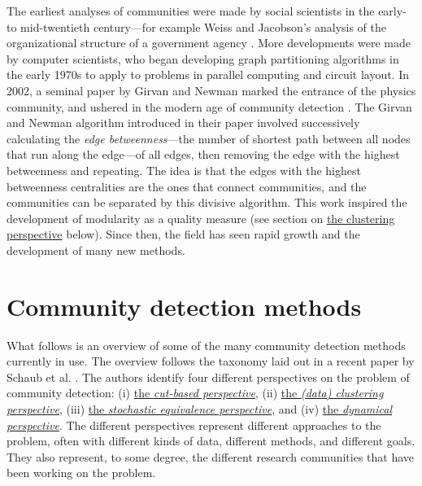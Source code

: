 The earliest analyses of communities were made by social scientists in
the early- to mid-twentieth century---for example Weiss and Jacobson's
analysis of the organizational structure of a government agency
\autocite{weiss_method_1955}. More developments were made by computer
scientists, who began developing graph partitioning algorithms in the
early 1970s to apply to problems in parallel computing and circuit
layout. In 2002, a seminal paper by Girvan and Newman
\autocite{girvan_community_2002} marked the entrance of the physics
community, and ushered in the modern age of community detection
\autocite{lancichinetti_community_2009}. The Girvan and Newman algorithm
introduced in their paper involved successively calculating the
\emph{edge betweenness}---the number of shortest path between all nodes
that run along the edge---of all edges, then removing the edge with the
highest betweenness and repeating. The idea is that the edges with the
highest betweenness centralities are the ones that connect communities,
and the communities can be separated by this divisive algorithm. This
work inspired the development of modularity as a quality measure (see
section on \protect\hyperlink{clustering-perspective}{the clustering
perspective} below). Since then, the field has seen rapid growth and the
development of many new methods.

\hypertarget{community-detection-methods}{\section{Community detection
methods}\label{community-detection-methods}}

\protect\hyperlink{community-detection-methods}{}

What follows is an overview of some of the many community detection
methods currently in use. The overview follows the taxonomy laid out in
a recent paper by Schaub et al. \autocite{schaub_many_2017}. The authors
identify four different perspectives on the problem of community
detection: (i) \protect\hyperlink{the-cut-based-perspective}{the
\emph{cut-based perspective}}, (ii)
\protect\hyperlink{the-clustering-perspective}{the \emph{(data)
clustering perspective}}, (iii)
\protect\hyperlink{the-stochastic-equivalence-perspective}{the
\emph{stochastic equivalence perspective}}, and (iv)
\protect\hyperlink{the-dynamical-perspective}{the \emph{dynamical
perspective}}. The different perspectives represent different approaches
to the problem, often with different kinds of data, different methods,
and different goals. They also represent, to some degree, the different
research communities that have been working on the problem.


